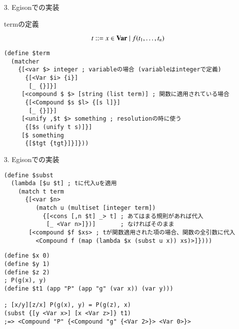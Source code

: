 \documentclass[dvipdfmx,11pt,notheorems]{beamer}
\theoremstyle{definition}
\begin{document}
\begin{frame}[fragile]{3. Egisonでの実装}
  \begin{block}{termの定義}
    \begin{screen}
      \[
      t ::= x \in {\bf Var} \mid f(t_1, \ldots, t_n)
      \]
    \end{screen}
  \begin{verbatim}
(define $term
  (matcher
    {[<var $> integer ; variableの場合 (variableはintegerで定義)
      {[<Var $i> {i}]
       [_ {}]}]
     [<compound $ $> [string (list term)] ; 関数に適用されている場合
      {[<Compound $s $l> {[s l]}]
       [_ {}]}]
     [<unify ,$t $> something ; resolutionの時に使う
      {[$s (unify t s)]}]
     [$ something
      {[$tgt {tgt}]}]}))
  \end{verbatim}
  \end{block}
\end{frame}

\begin{frame}[fragile]{3. Egisonでの実装}
  \begin{block}{}
    \begin{verbatim}
(define $subst
  (lambda [$u $t] ; tに代入uを適用　
    (match t term
      {[<var $n>
         (match u (multiset [integer term])
           {[<cons [,n $t] _> t] ; あてはまる規則があれば代入
            [_ <Var n>]})]       ; なければそのまま
       [<compound $f $xs> ; tが関数適用された項の場合、関数の全引数に代入
         <Compound f (map (lambda $x (subst u x)) xs)>]})))
    \end{verbatim}
  \end{block}

  \begin{exampleblock}{}
    \begin{verbatim}
(define $x 0)
(define $y 1)
(define $z 2)
; P(g(x), y)
(define $t1 (app "P" (app "g" (var x)) (var y)))

; [x/y][z/x] P(g(x), y) = P(g(z), x)
(subst {[y <Var x>] [x <Var z>]} t1)
;=> <Compound "P" {<Compound "g" {<Var 2>}> <Var 0>}>
    \end{verbatim}
  \end{exampleblock}
\end{frame}
\end{document}
